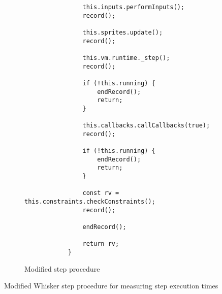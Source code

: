 \begin{listing}[htpb]
\begin{subfigure}[b]{.40\textwidth}
\begin{verbatim}
                this.inputs.performInputs();
                record();

                this.sprites.update();
                record();

                this.vm.runtime._step();
                record();

                if (!this.running) {
                    endRecord();
                    return;
                }

                this.callbacks.callCallbacks(true);
                record();

                if (!this.running) {
                    endRecord();
                    return;
                }

                const rv = this.constraints.checkConstraints();
                record();

                endRecord();

                return rv;
            }
        \end{verbatim}
        \vspace{-\bigskipamount}
        \caption{Modified step procedure}
    \end{subfigure}
    \caption{Modified Whisker step procedure for measuring step execution times}
    \label{lst:time_measurement_code}
\end{listing}

